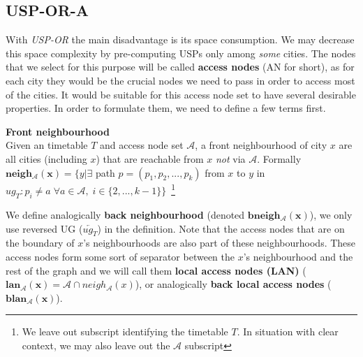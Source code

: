 \subsection{USP-OR-A}
	    
	With \textit{USP-OR} the main disadvantage is its space consumption. We may decrease this space complexity by pre-computing USPs only among \textit{some} cities. The nodes that we select for this purpose will be called \textbf{access nodes} (AN for short), as for each city they would be the crucial nodes we need to pass in order to access most of the cities. It would be suitable for this access node set to have several desirable properties. In order to formulate them, we need to define a few terms first.
	
	\begin{definition}
        \textbf{Front neighbourhood} \\
		Given an timetable $T$ and access node set $\mathcal{A}$, a front neighbourhood of city $x$ are all cities (including $x$) that are reachable from $x$ \textit{not} via $\mathcal{A}$. Formally $\bm{neigh_{\mathcal{A}}(x)} = \{y|\exists$ path $p = (p_{1}, p_{2}, ..., p_{k})$ from $x$ to $y$ in $ug_{T}: p_{i} \neq a \; \forall a \in \mathcal{A}, \; i \in \{2, ..., k - 1\} \}$~\footnote{We leave out subscript identifying the timetable $T$. In situation with clear context, we may also leave out the $\mathcal{A}$ subscript}
    \end{definition}
    
    \noindent We define analogically \textbf{back neighbourhood} (denoted $\bm{bneigh_{\mathcal{A}}(x)}$), we only use reversed UG ($\overleftarrow{ug_{T}}$) in the definition. Note that the access nodes that are on the boundary of $x$'s neighbourhoods are also part of these neighbourhoods. These access nodes form some sort of separator between the $x$'s neighbourhood and the rest of the graph and we will call them \textbf{local access nodes (LAN)} ($\bm{lan_{\mathcal{A}}(x)} = \mathcal{A} \cap neigh_{\mathcal{A}}(x)$), or analogically \textbf{back local access nodes} ($\bm{blan_{\mathcal{A}}(x)}$). \\
    
